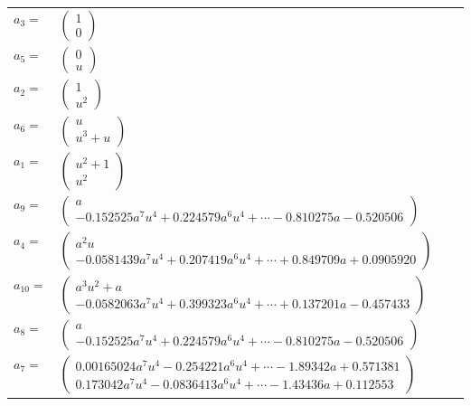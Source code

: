 \documentclass[1p]{elsarticle_modified}
\theoremstyle{definition}
\begin{document}
\begin{tabular}{m{7pt} m{180pt} m{7pt} m{180pt} }
\flushright $a_{3}=$&$\begin{pmatrix}1\\0\end{pmatrix}$ \\
\flushright $a_{5}=$&$\begin{pmatrix}0\\u\end{pmatrix}$ \\
\flushright $a_{2}=$&$\begin{pmatrix}1\\u^2\end{pmatrix}$ \\
\flushright $a_{6}=$&$\begin{pmatrix}u\\u^3+u\end{pmatrix}$ \\
\flushright $a_{1}=$&$\begin{pmatrix}u^2+1\\u^2\end{pmatrix}$ \\
\flushright $a_{9}=$&$\begin{pmatrix}a\\-0.152525 a^{7} u^{4}+0.224579 a^{6} u^{4}+\cdots-0.810275 a-0.520506\end{pmatrix}$ \\
\flushright $a_{4}=$&$\begin{pmatrix}a^2 u\\-0.0581439 a^{7} u^{4}+0.207419 a^{6} u^{4}+\cdots+0.849709 a+0.0905920\end{pmatrix}$ \\
\flushright $a_{10}=$&$\begin{pmatrix}a^3 u^2+a\\-0.0582063 a^{7} u^{4}+0.399323 a^{6} u^{4}+\cdots+0.137201 a-0.457433\end{pmatrix}$ \\
\flushright $a_{8}=$&$\begin{pmatrix}a\\-0.152525 a^{7} u^{4}+0.224579 a^{6} u^{4}+\cdots-0.810275 a-0.520506\end{pmatrix}$ \\
\flushright $a_{7}=$&$\begin{pmatrix}0.00165024 a^{7} u^{4}-0.254221 a^{6} u^{4}+\cdots-1.89342 a+0.571381\\0.173042 a^{7} u^{4}-0.0836413 a^{6} u^{4}+\cdots-1.43436 a+0.112553\end{pmatrix}$ \\

\end{tabular}
\end{document}
